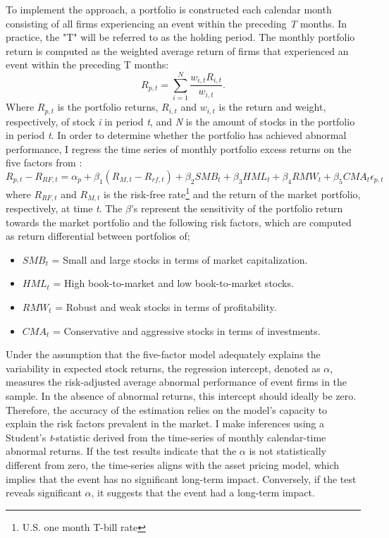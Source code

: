 To implement the approach, a portfolio is constructed each calendar month consisting of all firms experiencing an event within the preceding \textit{T} months. In practice, the "T" will be referred to as the holding period. The monthly portfolio return is computed as the weighted average return of firms that experienced an event within the preceding T months:
\begin{equation}
    R_{p,t} = \sum_{i=1} ^{N} \frac{w_{i,t} R_{i,t} }{ w_{i,t}  } .
\end{equation}
Where $R_{p,t}$ is the portfolio returns, $R_{i,t}$ and $w_{i,t}$ is the return and weight, respectively, of stock \textit{i} in period \textit{t}, and \textit{N} is the amount of stocks in the portfolio in period \textit{t}. In order to determine whether the portfolio has achieved abnormal performance, I regress the time series of monthly portfolio excess returns on the five factors from \cite{fama2015five}: 
\begin{equation} \label{eq: FF5}
    R_{p,t} - R_{RF,t} = \alpha_p + \beta_1(R_{M,t} - R_{rf,t}) + \beta_2 SMB_t + \beta_3 HML_t + \beta_4 RMW_t + \beta_5 CMA_t \epsilon_{p,t} 
\end{equation}
where $R_{RF,t}$ and $R_{M,t}$ is the risk-free rate\footnote{U.S. one month T-bill rate} and the return of the market portfolio, respectively, at time \textit{t}. The $\beta$'s represent the sensitivity of the portfolio return towards the market portfolio and the following risk factors, which are computed as return differential between portfolios of;
\begin{itemize}
  \item $SMB_t$ = Small and large stocks in terms of market capitalization.
  \item $HML_t$ = High book-to-market and low book-to-market stocks.
  \item \textbf{$RMW_t$} = Robust and weak stocks in terms of profitability.
  \item \textbf{$CMA_t$} = Conservative and aggressive stocks in terms of investments.  
\end{itemize}

Under the assumption that the five-factor model adequately explains the variability in expected stock returns, the regression intercept, denoted as $\alpha$, measures the risk-adjusted average abnormal performance of event firms in the sample. In the absence of abnormal returns, this intercept should ideally be zero. Therefore, the accuracy of the estimation relies on the model's capacity to explain the risk factors prevalent in the market. I make inferences using a Student's \textit{t}-statistic derived from the time-series of monthly calendar-time abnormal returns. If the test results indicate that the $\alpha$ is not statistically different from zero, the time-series aligns with the asset pricing model, which implies that the event has no significant long-term impact. Conversely, if the test reveals significant $\alpha$, it suggests that the event had a long-term impact.

